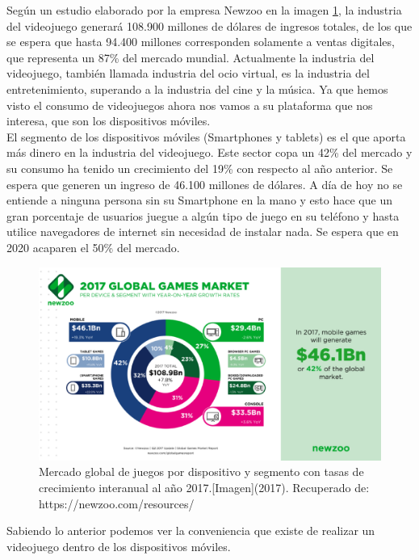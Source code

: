 			 Según un estudio elaborado por la empresa Newzoo en la imagen \ref{fig:newzooIndMun}, la industria del videojuego generará 108.900 millones de dólares de ingresos totales, de los que se espera que hasta 94.400 millones corresponden solamente a ventas digitales, que representa un 87\% del mercado mundial. Actualmente la industria del videojuego, también llamada industria del ocio virtual, es la industria del entretenimiento, superando a la industria del cine y la música. Ya que hemos visto el consumo de videojuegos ahora nos vamos a su plataforma que nos interesa, que son los dispositivos móviles.
			 \\[1pt]	
			 
			 El segmento de los dispositivos móviles (Smartphones y tablets) es el que aporta más dinero en la industria del videojuego. Este sector copa un 42\% del mercado y su consumo ha tenido un crecimiento del 19\% con respecto al año anterior. Se espera que generen un ingreso de 46.100 millones de dólares. A día de hoy no se entiende a ninguna persona sin su Smartphone en la mano y esto hace que un gran porcentaje de usuarios juegue a algún tipo de juego en su teléfono y hasta utilice navegadores de internet sin necesidad de instalar nada. Se espera que en 2020 acaparen el 50\% del mercado. \cite{vid01}
			 \\[1pt]   
			 
			 	\begin{figure}
			 	\centering
			 	\includegraphics[width=\textwidth]{03MarcoTeorico/imageR/newzooIndMun}
			 	\caption{Mercado global de juegos por dispositivo y segmento con tasas de crecimiento interanual al año 2017.[Imagen](2017). Recuperado de: https://newzoo.com/resources/}
			 	\label{fig:newzooIndMun}
			 \end{figure}	
		 
		 Sabiendo lo anterior podemos ver la conveniencia que existe de realizar un videojuego dentro de los dispositivos móviles.
			 
